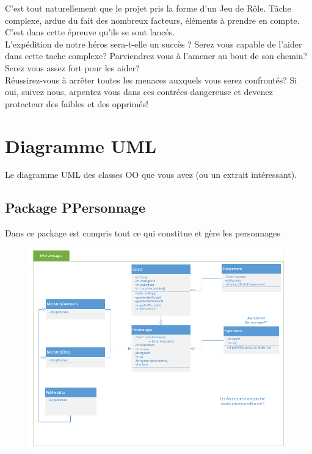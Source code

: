 \documentclass[a4paper,titlepage]{article}
\begin{document}
	C’est tout naturellement que le projet pris la forme d’un Jeu de Rôle. Tâche complexe, ardue du fait des nombreux facteurs, éléments à prendre en compte. C’est dans cette épreuve qu’ils se sont lancés.\\

	L’expédition de notre héros sera-t-elle un succès ? Serez vous capable de l’aider dans cette tache complexe? Parviendrez vous à l’amener au bout de son chemin?Serez vous assez fort pour les aider?\\
	
Réussirez-vous à arrêter toutes les menaces auxquels vous serez confrontés?
Si oui, suivez nous, arpentez vous dans ces contrées dangereuse et devenez protecteur des faibles et des opprimés!

	
	\clearpage
	\section{Diagramme UML}
	Le diagramme UML des classes OO que vous avez (ou un extrait intéressant).\\
	\subsection{Package PPersonnage}	
	
	Dans ce package est compris tout ce qui constitue et gère les personnages
	\begin{figure}[h!]
		\includegraphics[scale=0.70]{PPersonnage.png}
	\end{figure}
	\clearpage
	
\end{document}
